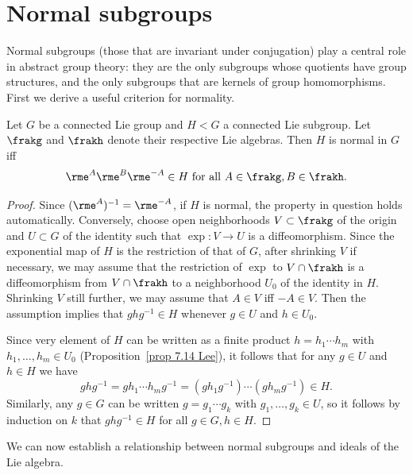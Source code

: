 \section{Normal subgroups}

Normal subgroups (those that are invariant under conjugation) play a central role in abstract group theory: they are the only subgroups whose quotients have group structures, and the only subgroups that are kernels of group homomorphisms. First we derive a useful criterion for normality.

\begin{lem}\label{lem 20.23 Lee}
    Let $G$ be a connected Lie group and $H<G$ a connected Lie subgroup. Let $\frakg$ and $\frakh$ denote their respective Lie algebras. Then $H$ is normal in $G$ iff
    \[\rme^A \rme^B \rme^{-A}\in H \text{ for all }A\in \frakg,B\in\frakh.\]
\end{lem}
\begin{proof}
    Since $(\rme^A)^{-1}=\rme^{-A}$, if $H$ is normal, the property in question holds automatically. Conversely, choose open neighborhoods $V\subset \frakg$ of the origin and $U\subset G$ of the identity such that $\exp:V\to U$ is a diffeomorphism. Since the exponential map of $H$ is the restriction of that of $G$, after shrinking $V$ if necessary, we may assume that the restriction of $\exp$ to $V\cap \frakh$ is a diffeomorphism from $V\cap \frakh$ to a neighborhood $U_0$ of the identity in $H$. Shrinking $V$ still further, we may assume that $A\in V$ iff $-A\in V$. Then the assumption implies that $ghg^{-1}\in H$ whenever $g\in U$ and $h\in U_0$.

    Since very element of $H$ can be written as a finite product $h=h_1\cdots h_m$ with $h_1,\ldots, h_m\in U_0$ (Proposition~\ref{prop 7.14 Lee}), it follows that for any $g\in U$ and $h\in H$ we have
    \[ghg^{-1}=gh_1\cdots h_m g^{-1}=(gh_1g^{-1})\cdots (gh_m g^{-1})\in H.\]
    Similarly, any $g\in G$ can be written $g=g_1\cdots g_k$ with $g_1,\ldots, g_k\in U$, so it follows by induction on $k$ that $ghg^{-1}\in H$ for all $g\in G,h\in H$.
\end{proof}


We can now establish a relationship between normal subgroups and ideals of the Lie algebra.

